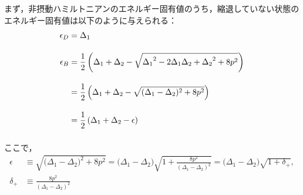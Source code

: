 まず，非摂動ハミルトニアンのエネルギー固有値のうち，縮退していない状態のエネルギー固有値は以下のように与えられる：
\begin{align}
    \epsilon_D&=
    {\Delta_{1}}\\[10pt]
    \epsilon_B&=
    \frac{1}{2}\left({\Delta_{1}}+{\Delta_{2}}-\sqrt{{\Delta_{1}}^2-2{\Delta_{1}}{\Delta_{2}}+{\Delta_{2}}^2+8{p}^2}\right)\nn[10pt]
    &=\frac{1}{2}\left({\Delta_{1}}+{\Delta_{2}}-\sqrt{{
    (\Delta_{1}}-{\Delta_{2}})^2+8{p}^2}\right)\nn[10pt]
    &=\frac{1}{2}\left({\Delta_{1}}+{\Delta_{2}}-\epsilon\right)\nn[10pt]
\end{align}
ここで，
\begin{align}
    \epsilon&\equiv
    \sqrt{{
    (\Delta_{1}}-{\Delta_{2}})^2+8{p}^2}
    ={(\Delta_{1}}-{\Delta_{2}})
    \sqrt{1+\frac{8{p}^2}{(\Delta_{1}-\Delta_{2})^2}}
    ={(\Delta_{1}}-{\Delta_{2}})\sqrt{1+\delta_+},\\[10pt]
    \delta_+ &\equiv \frac{8{p}^2}{(\Delta_{1}-\Delta_{2})^2}
\end{align}

